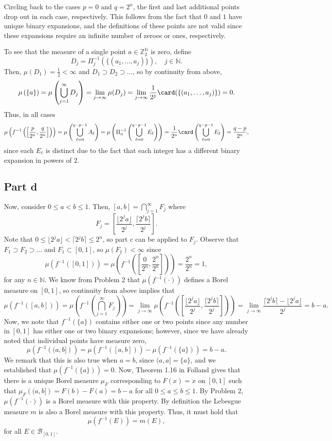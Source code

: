 \documentclass{article}
\begin{document}
Circling back to the cases $p=0$ and $q=2^n$, the first and last additional points drop out in each case, respectively. This follows from the fact that $0$ and $1$ have unique binary expansions, and the definitions of these points are not valid since these expansions require an infinite number of zeroes or ones, respectively.

To see that the measure of a single point $a\in\mathbb{Z}^\mathbb{N}_2$ is zero, define
\[
D_j=\Pi^{-1}_j\left(\{(a_1,\ldots,a_j)\}\right),\quad j\in\mathbb{N}.
\] 
Then, $\mu(D_1)=\frac{1}{2}<\infty$ and $D_1\supset D_2\supset\ldots$, so by continuity from above,
\[
\mu\left(\{a\}\right)=\mu\left(\bigcup_{j=1}^\infty D_j\right)=\lim_{j\to\infty}\mu(D_j)=\lim_{j\to\infty}\frac{1}{2^j}\card(\{(a_1,\ldots,a_j)\})=0.
\]
Thus, in all cases
\[
\mu\left(f^{-1}\left(\left[\frac{p}{2^n},\frac{q}{2^n}\right]\right)\right)=\mu\left(\bigcup_{\ell=0}^{q-p-1}A_\ell\right)=\mu\left(\Pi_n^{-1}\left(\bigcup_{\ell=0}^{q-p-1}E_\ell\right)\right)=\frac{1}{2^n}\card\left(\bigcup_{\ell=0}^{q-p-1}E_\ell\right)=\frac{q-p}{2^n},
\]
since each $E_\ell$ is distinct due to the fact that each integer has a different binary expansion in powers of 2. 

\subsection{Part d}
Now, consider $0\leq a<b\leq 1$. Then, $[a,b]=\bigcap_{j=1}^\infty F_j$ where
\[
F_j=\left[\frac{\lfloor 2^ja\rfloor}{2^j},\frac{\lceil 2^jb\rceil}{2^j}\right].
\]
Note that $0\leq\lfloor 2^ja\rfloor<\lceil 2^jb\rceil\leq2^n$, so part c can be applied to $F_j$. Observe that $F_1\supset F_2\supset\ldots$ and $F_1\subset[0,1]$, so $\mu(F_1)<\infty$ since
\[
\mu\left(f^{-1}\left([0,1]\right)\right)=\mu\left(f^{-1}\left(\left[\frac{0}{2^n},\frac{2^n}{2^n}\right]\right)\right)=\frac{2^n}{2^n}=1,
\]
for any $n\in\mathbb{N}$. We know from Problem 2 that $\mu(f^{-1}(\cdot))$ defines a Borel measure on $[0,1]$, so continuity from above implies that 
\[
\mu\left(f^{-1}\left([a,b]\right)\right)=\mu\left(f^{-1}\left(\bigcap_{j=1}^\infty F_j\right)\right)=\lim_{j\to\infty}\mu\left(f^{-1}\left(\left[\frac{\lfloor 2^ja\rfloor}{2^j},\frac{\lceil 2^jb\rceil}{2^j}\right]\right)\right)=\lim_{j\to\infty}\frac{\lceil 2^jb\rceil-\lfloor 2^ja\rfloor}{2^j}=b-a.
\]
Now, we note that $f^{-1}(\{a\})$ contains either one or two points since any number in $[0,1]$ has either one or two binary expansions; however, since we have already noted that individual points have measure zero,
\[
\mu\left(f^{-1}\left((a,b]\right)\right)=\mu\left(f^{-1}\left([a,b]\right)\right)-\mu\left(f^{-1}\left(\{a\}\right)\right)=b-a.
\]
We remark that this is also true when $a=b$, since $(a,a]=\{a\}$, and we established that $\mu\left(f^{-1}\left(\{a\}\right)\right)=0$. Now, Theorem 1.16 in Folland gives that there is a unique Borel measure $\mu_F$ corresponding to $F(x)=x$ on $[0,1]$ such that $\mu_F\left((a,b]\right)=F(b)-F(a)=b-a$ for all $0\leq a\leq b\leq 1$. By Problem 2, $\mu(f^{-1}(\cdot))$ is a Borel measure with this property. By definition the Lebesgue measure $m$ is also a Borel measure with this property. Thus, it must hold that
\[
\mu\left(f^{-1}\left(E\right)\right)=m(E),
\]
for all $E\in\mathcal B_{[0,1]}$.
\end{document}
